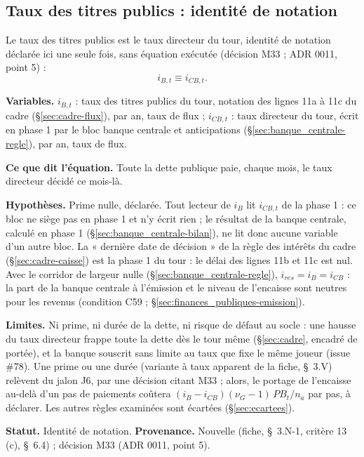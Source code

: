 \documentclass[11pt,a4paper]{article}
\newcommand{\variables}{\par\noindent\textbf{Variables.} }
\newcommand{\sens}{\par\noindent\textbf{Ce que dit l'équation.} }
\newcommand{\hyp}{\par\noindent\textbf{Hypothèses.} }
\newcommand{\limites}{\par\noindent\textbf{Limites.} }
\begin{document}
\subsection{Taux des titres publics : identité de notation}
\label{sec:finances_publiques-taux}
\begin{proposee}
Le taux des titres publics est le taux directeur du tour, identité de notation déclarée ici une seule fois, sans équation exécutée (décision M33 ; ADR 0011, point 5) :
\begin{equation*}
i_{B,t} \equiv i_{\mathit{CB},t} .
\end{equation*}

\variables $i_{B,t}$ : taux des titres publics du tour, notation des lignes 11a à 11c du cadre (\S\ref{sec:cadre-flux}), par an, taux de flux ; $i_{\mathit{CB},t}$ : taux directeur du tour, écrit en phase 1 par le bloc banque centrale et anticipations (\S\ref{sec:banque_centrale-regle}), par an, taux de flux.
\sens Toute la dette publique paie, chaque mois, le taux directeur décidé ce mois-là.
\hyp Prime nulle, déclarée. Tout lecteur de $i_B$ lit $i_{\mathit{CB},t}$ de la phase 1 : ce bloc ne siège pas en phase 1 et n'y écrit rien ; le résultat de la banque centrale, calculé en phase 1 (\S\ref{sec:banque_centrale-bilan}), ne lit donc aucune variable d'un autre bloc. La « dernière date de décision » de la règle des intérêts du cadre (\S\ref{sec:cadre-caisse}) est la phase 1 du tour : le délai des lignes 11b et 11c est nul. Avec le corridor de largeur nulle (\S\ref{sec:banque_centrale-regle}), $i_{\mathit{res}} = i_B = i_{\mathit{CB}}$ : la part de la banque centrale à l'émission et le niveau de l'encaisse sont neutres pour les revenus (condition C59 ; \S\ref{sec:finances_publiques-emission}).
\limites Ni prime, ni durée de la dette, ni risque de défaut au socle : une hausse du taux directeur frappe toute la dette dès le tour même (\S\ref{sec:cadre}, encadré de portée), et la banque souscrit sans limite au taux que fixe le même joueur (issue \#78). Une prime ou une durée (variante à taux apparent de la fiche, \S~3.V) relèvent du jalon J6, par une décision citant M33 ; alors, le portage de l'encaisse au-delà d'un pas de paiements coûtera $(i_B - i_{\mathit{CB}})(\nu_G - 1)\,\mathit{PB}_t/n_a$ par pas, à déclarer. Les autres règles examinées sont écartées (\S\ref{sec:ecartees}).

\textbf{Statut.} Identité de notation. \textbf{Provenance.} Nouvelle (fiche, \S~3.N-1, critère 13\,(c), \S~6.4) ; décision M33 (ADR 0011, point 5).
\end{proposee}
\end{document}
